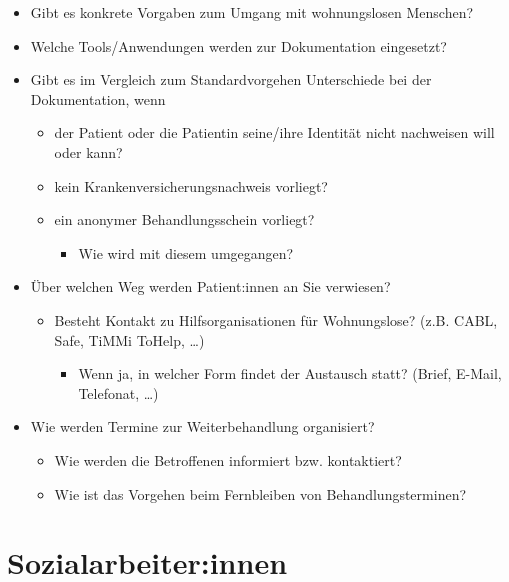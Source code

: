 \begin{itemize}
	\item Gibt es konkrete Vorgaben zum Umgang mit wohnungslosen Menschen?
	\item Welche Tools/Anwendungen werden zur Dokumentation eingesetzt?
	\item Gibt es im Vergleich zum Standardvorgehen Unterschiede bei der Dokumentation, wenn
	\begin{itemize}
		\item der Patient oder die Patientin seine/ihre Identität nicht nachweisen will oder kann?
		\item kein Krankenversicherungsnachweis vorliegt?
		\item ein anonymer Behandlungsschein vorliegt?
		\begin{itemize}
			\item Wie wird mit diesem umgegangen?
		\end{itemize}
	\end{itemize}
	\item Über welchen Weg werden Patient:innen an Sie verwiesen?
	\begin{itemize}
		\item Besteht Kontakt zu Hilfsorganisationen für Wohnungslose? (z.B. CABL, Safe, TiMMi ToHelp, …)
		\begin{itemize}
			\item Wenn ja, in welcher Form findet der Austausch statt? (Brief, E-Mail, Telefonat, …)
		\end{itemize}
	\end{itemize}
	\item Wie werden Termine zur Weiterbehandlung organisiert?
	\begin{itemize}
		\item Wie werden die Betroffenen informiert bzw. kontaktiert?
		\item Wie ist das Vorgehen beim Fernbleiben von Behandlungsterminen?
	\end{itemize}
\end{itemize}

\newpage

\section{Sozialarbeiter:innen}

